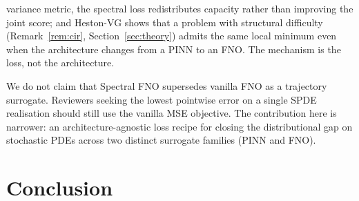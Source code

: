 \documentclass[review,12pt]{elsarticle}
\begin{document}
variance metric, the spectral loss redistributes capacity rather
than improving the joint score; and Heston-VG shows that a problem
with structural difficulty
(Remark~\ref{rem:cir}, Section~\ref{sec:theory}) admits the same
local minimum even when the architecture changes from a PINN to an
FNO. The mechanism is the loss, not the architecture.

We do not claim that Spectral FNO supersedes vanilla FNO as a
trajectory surrogate. Reviewers seeking the lowest pointwise error
on a single SPDE realisation should still use the vanilla MSE
objective. The contribution here is narrower: an architecture-agnostic
loss recipe for closing the distributional gap on stochastic PDEs
across two distinct surrogate families (PINN and FNO).


\section{Conclusion}
\label{sec:conclusion}
\end{document}

